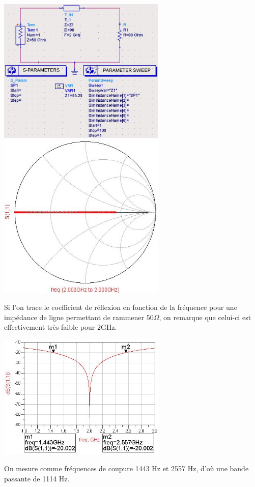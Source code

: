 \documentclass[10pt]{article}
\begin{document}
   \includegraphics[width=8cm]{I2_e_impedances-circuit.jpg}
   \includegraphics[width=8cm]{I2_e_impedances-simulation.jpg}

   \newpage
   Si l’on trace le coefficient de réflexion en fonction de la fréquence pour une impédance de ligne permettant de rammener $50 \Omega$, on remarque que celui-ci est effectivement très faible pour 2GHz.
   
   \includegraphics[width=8cm]{I2_e_bode.jpg}

   On mesure comme fréquences de coupure 1443 Hz et 2557 Hz, d’où une bande passante de 1114 Hz.
\end{document}
